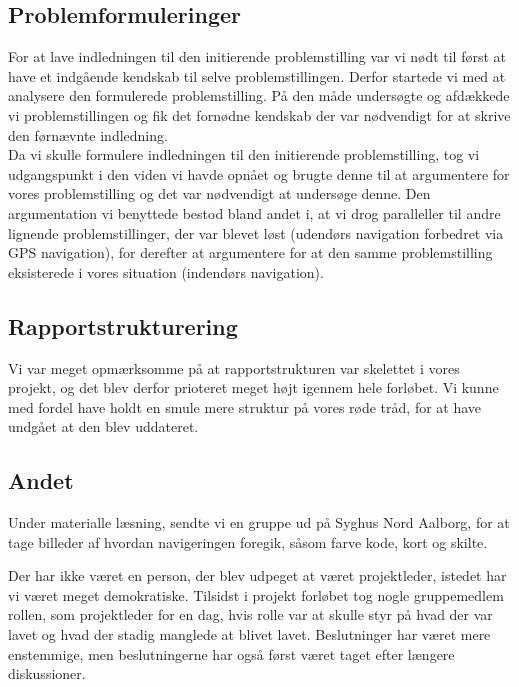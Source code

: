 \documentclass[a4paper,12pt, article]{memoir}
\begin{document}
        \subsection{Problemformuleringer}
        For at lave indledningen til den initierende problemstilling var vi nødt til først at have et indgående kendskab til selve problemstillingen. Derfor startede vi med at analysere den formulerede problemstilling. På den måde undersøgte og afdækkede vi problemstillingen og fik det fornødne kendskab der var nødvendigt for at skrive den førnævnte indledning.\\
        Da vi skulle formulere indledningen til den initierende problemstilling, tog vi udgangspunkt i den viden vi havde opnået og brugte denne til at argumentere for vores problemstilling og det var nødvendigt at undersøge denne. Den argumentation vi benyttede bestod bland andet i, at vi drog paralleller til andre lignende problemstillinger, der var blevet løst (udendørs navigation forbedret via GPS navigation), for derefter at argumentere for at den samme problemstilling eksisterede i vores situation (indendørs navigation).

        \subsection{Rapportstrukturering}

        Vi var meget opmærksomme på at rapportstrukturen var skelettet i vores projekt, og det blev derfor prioteret meget højt igennem hele forløbet. Vi kunne med fordel have holdt en smule mere struktur på vores røde tråd, for at have undgået at den blev uddateret.


        \subsection{Andet}
        Under materialle læsning, sendte vi en gruppe ud på Syghus Nord Aalborg, for at tage billeder af hvordan navigeringen foregik, såsom farve kode, kort og skilte.

        Der har ikke været en person, der blev udpeget at været projektleder, istedet har vi været meget demokratiske. Tilsidst i projekt forløbet tog nogle gruppemedlem rollen, som projektleder for en dag, hvis rolle var at skulle styr på hvad der var lavet og hvad der stadig manglede at blivet lavet. Beslutninger har været mere enstemmige, men beslutningerne har også først været taget efter længere diskussioner.
\end{document}
